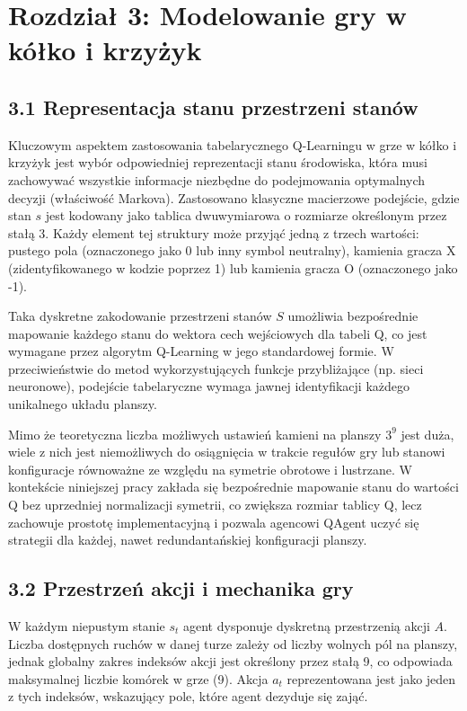 \documentclass[conference]{IEEEtran}
\begin{document}
\section{Rozdział 3: Modelowanie gry w kółko i krzyżyk}
\subsection{3.1 Representacja stanu przestrzeni stanów}
Kluczowym aspektem zastosowania tabelarycznego Q-Learningu w grze w kółko i krzyżyk jest wybór odpowiedniej reprezentacji stanu środowiska, która musi zachowywać wszystkie informacje niezbędne do podejmowania optymalnych decyzji (właściwość Markova). Zastosowano klasyczne macierzowe podejście, gdzie stan $s$ jest kodowany jako tablica dwuwymiarowa o rozmiarze określonym przez stałą 3. Każdy element tej struktury może przyjąć jedną z trzech wartości: pustego pola (oznaczonego jako 0 lub inny symbol neutralny), kamienia gracza X (zidentyfikowanego w kodzie poprzez 1) lub kamienia gracza O (oznaczonego jako -1). 

Taka dyskretne zakodowanie przestrzeni stanów $S$ umożliwia bezpośrednie mapowanie każdego stanu do wektora cech wejściowych dla tabeli Q, co jest wymagane przez algorytm Q-Learning w jego standardowej formie. W przeciwieństwie do metod wykorzystujących funkcje przybliżające (np. sieci neuronowe), podejście tabelaryczne wymaga jawnej identyfikacji każdego unikalnego układu planszy.

Mimo że teoretyczna liczba możliwych ustawień kamieni na planszy $3^{9}$ jest duża, wiele z nich jest niemożliwych do osiągnięcia w trakcie regułów gry lub stanowi konfiguracje równoważne ze względu na symetrie obrotowe i lustrzane. W kontekście niniejszej pracy zakłada się bezpośrednie mapowanie stanu do wartości Q bez uprzedniej normalizacji symetrii, co zwiększa rozmiar tablicy Q, lecz zachowuje prostotę implementacyjną i pozwala agencowi QAgent uczyć się strategii dla każdej, nawet redundantańskiej konfiguracji planszy.

\subsection{3.2 Przestrzeń akcji i mechanika gry}
W każdym niepustym stanie $s_t$ agent dysponuje dyskretną przestrzenią akcji $A$. Liczba dostępnych ruchów w danej turze zależy od liczby wolnych pól na planszy, jednak globalny zakres indeksów akcji jest określony przez stałą 9, co odpowiada maksymalnej liczbie komórek w grze (9). Akcja $a_t$ reprezentowana jest jako jeden z tych indeksów, wskazujący pole, które agent dezyduje się zająć.
\end{document}
